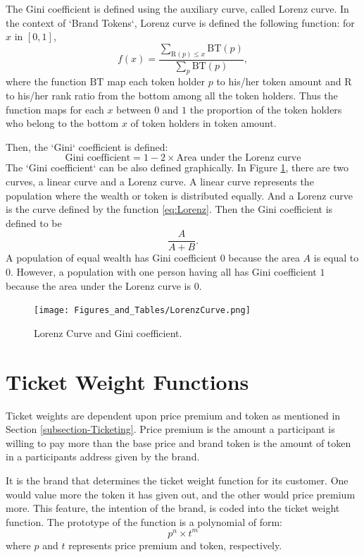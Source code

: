 \documentclass[runningheads]{llncs}
\begin{document}
The Gini coefficient is defined using the auxiliary curve, called Lorenz curve. In the context of `Brand Tokens`, Lorenz curve is defined the following function: for $x$ in $[0,1]$,
\begin{equation}\label{eq:Lorenz}
f(x) =  \frac{ \sum_{\mathrm{R} (p) \leq x} \mathrm{BT} (p) }{\sum_{p} \mathrm{BT} (p)},
\end{equation}
where the function $\mathrm{BT}$ map each token holder $p$ to his/her token amount and $\mathrm{R}$ to his/her rank ratio from the bottom among all the token holders. Thus the function maps for each $x$ between $0$ and $1$ the proportion of the token holders who belong to the bottom $x$ of token holders in token amount.

Then, the `Gini` coefficient is defined:
$$
\textrm{Gini coefficient} = 1 - 2 \times \textrm{Area under the Lorenz curve}
$$
The `Gini coefficient` can be also defined graphically. In Figure \ref{fig:Lorenz}, there are two curves, a linear curve and a Lorenz curve. A linear curve represents the population where the wealth or token is distributed  equally. And a Lorenz curve is the curve defined by the function \ref{eq:Lorenz}. Then the Gini coefficient is defined to be
$$
\frac{A}{A+B}.
$$
A population of equal wealth has Gini coefficient $0$ because the area $A$ is equal to $0$. However, a population with one person having all has Gini coefficient  $1$ because the area under the Lorenz curve is $0$.

\begin{figure}[H]
\centering
\texttt{[image: Figures\_and\_Tables/LorenzCurve.png]}
\caption{Lorenz Curve and Gini coefficient.}
\label{fig:Lorenz}
\end{figure}



\section{Ticket Weight Functions}\label{APP-TWF}
Ticket weights are dependent upon price premium and token as mentioned in Section \ref{subsection-Ticketing}. Price premium is the amount a participant is willing to pay more than the base price and brand token is the amount of token in a participants address given by the brand.

It is the brand that determines the ticket weight function for its customer. One would value more the token it has given out, and the other would price premium more. This feature, the intention of the brand, is coded into the ticket weight function. The prototype of the function is a polynomial of form:
$$
p^n \times t^m
$$
where $p$ and $t$ represents price premium and token, respectively.
\end{document}
